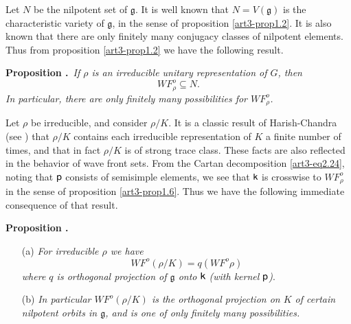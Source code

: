 Let $N$ be the nilpotent set of $\mathfrak{g}$. It is well known that $N=V(\mathfrak{g})$ is the characteristic variety of $\mathfrak{g}$, in the sense of proposition \ref{art3-prop1.2}. It is also known that there are only finitely many conjugacy classes of nilpotent elements. Thus from proposition \ref{art3-prop1.2} we have the following result.

\medskip
\noindent
{\bf Proposition .\label{art3-prop2.4}}~{\em If $\rho$ is an irreducible unitary representation of $G$, then}
\begin{equation*}
WF^{o}_{\rho}\subseteq N.\tag{2.25}\label{art3-eq2.25}
\end{equation*}
{\em In particular, there are only finitely many possibilities for $WF^{o}_{\rho}$.}

Let $\rho$ be irreducible, and consider $\rho/K$. It is a classic result of Harish-Chandra (see \cite{art3-W}) that $\rho/K$ contains each irreducible representation of $K$ a finite number of times, and that in fact $\rho/K$ is of strong trace class. These facts are also reflected in the behavior of wave front sets. From the Cartan decomposition \eqref{art3-eq2.24}, noting that $\mathsf{p}$ consists of semisimple elements, we see that $\mathsf{k}$ is crosswise to $WF^{o}_{\rho}$ in the sense of proposition \ref{art3-prop1.6}. Thus we have the following immediate consequence of that result.

\medskip
\noindent
{\bf Proposition .\label{art3-prop2.5}}
\begin{itemize}
\item[(a)] {\em For irreducible $\rho$ we have}
\begin{equation*}
WF^{o}(\rho/K)=q(WF^{o}\rho)\tag{2.26}\label{art3-eq2.26}
\end{equation*}
{\em where $q$ is orthogonal projection of $\mathfrak{g}$ onto $\mathsf{k}$ (with kernel $\mathsf{p}$)}.

\item[(b)] {\em In particular $WF^{o}(\rho/K)$ is the orthogonal projection on $K$ of certain nilpotent orbits in $\mathfrak{g}$, and is one of only finitely many possibilities.}
\end{itemize}

